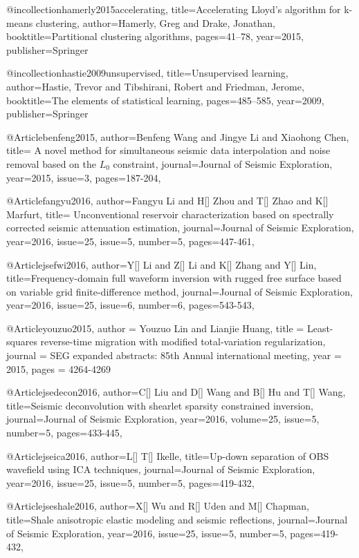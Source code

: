 @incollection{hamerly2015accelerating,
  title={Accelerating Lloyd’s algorithm for k-means clustering},
  author={Hamerly, Greg and Drake, Jonathan},
  booktitle={Partitional clustering algorithms},
  pages={41--78},
  year={2015},
  publisher={Springer}
}

@incollection{hastie2009unsupervised,
  title={Unsupervised learning},
  author={Hastie, Trevor and Tibshirani, Robert and Friedman, Jerome},
  booktitle={The elements of statistical learning},
  pages={485--585},
  year={2009},
  publisher={Springer}
}

@Article{benfeng2015,
  author={Benfeng Wang and Jingye Li and Xiaohong Chen},
  title={ A novel method for simultaneous seismic data interpolation and noise removal based on the $L_0$ constraint},
  journal={Journal of Seismic Exploration},
  year=2015,
  issue=3,
  pages={187-204},
}

@Article{fangyu2016,
  author={Fangyu Li and H[] Zhou and T[] Zhao and K[] Marfurt},
  title={ Unconventional reservoir characterization based on spectrally corrected seismic attenuation estimation},
  journal={Journal of Seismic Exploration},
  year=2016,
  issue=25,
  issue=5,
  number=5,
  pages={447-461},
}

@Article{jsefwi2016,
  author={Y[] Li and Z[] Li and K[] Zhang and Y[] Lin},
  title={Frequency-domain full waveform inversion with rugged free surface based on variable grid finite-difference method},
  journal={Journal of Seismic Exploration},
  year=2016,
  issue=25,
  issue=6,
  number=6,
  pages={543-543},
}

@Article{youzuo2015,
  author = 	 {Youzuo Lin and Lianjie Huang},
  title = 	 {Least-squares reverse-time migration with modified total-variation regularization},
  journal = 	 {SEG expanded abstracts: 85th Annual international meeting},
  year = 	 2015,
  pages =	 {4264-4269}
}


@Article{jsedecon2016,
  author={C[] Liu and D[] Wang and B[] Hu and T[] Wang},
  title={Seismic deconvolution with shearlet sparsity constrained inversion},
  journal={Journal of Seismic Exploration},
  year=2016,
  volume=25,
  issue=5,
  number=5,
  pages={433-445},
}

@Article{jseica2016,
  author={L[] T[] Ikelle},
  title={Up-down separation of OBS wavefield using ICA techniques},
  journal={Journal of Seismic Exploration},
  year=2016,
  issue=25,
  issue=5,
  number=5,
  pages={419-432},
}

@Article{jseshale2016,
  author={X[] Wu and R[] Uden and M[] Chapman},
  title={Shale anisotropic elastic modeling and seismic reflections},
  journal={Journal of Seismic Exploration},
  year=2016,
  issue=25,
  issue=5,
  number=5,
  pages={419-432},
}


